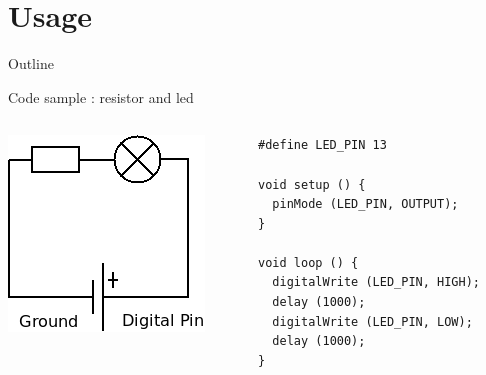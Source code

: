 \section{Usage}

\begin{frame}{Outline}
    \tableofcontents [current]
\end{frame}



\begin{frame}[containsverbatim]{Code sample : resistor and led}
	\begin{columns}[c,onlytextwidth]
		\begin{column}[c]{.5\textwidth}
			\begin{center}
				\includegraphics [width=.9\textwidth,keepaspectratio]{img/resistor_led.png}
			\end{center}
		\end{column}
		\begin{column}[c]{.5\textwidth}
\begin{Verbatim}[fontsize=\scriptsize]
#define LED_PIN 13

void setup () {
  pinMode (LED_PIN, OUTPUT);
}

void loop () {
  digitalWrite (LED_PIN, HIGH);
  delay (1000);
  digitalWrite (LED_PIN, LOW);
  delay (1000);
}
\end{Verbatim}
		\end{column}
	\end{columns}
\end{frame}

